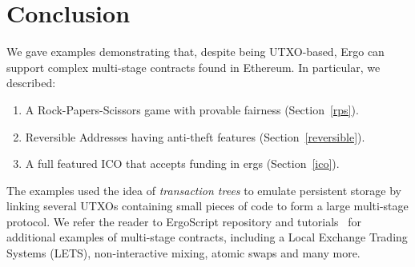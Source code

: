 \documentclass[runningheads]{llncs}
\newcommand{\langname}{ErgoScript\xspace}
\begin{document}
\section{Conclusion}

We gave examples demonstrating that, despite being UTXO-based, Ergo can support complex multi-stage contracts found in Ethereum. In particular, we described:

\begin{enumerate}
	\item A Rock-Papers-Scissors game with provable fairness (Section~\ref{rps}).
	\item Reversible Addresses having anti-theft features (Section~\ref{reversible}).
	\item A full featured ICO that accepts funding in ergs (Section~\ref{ico}). 

\end{enumerate}


The examples used the idea of {\em transaction trees} to emulate persistent storage by linking several UTXOs containing small pieces of code to form a large multi-stage protocol. 
We refer the reader to \langname repository and tutorials~\cite{tutorial,advtutorial} for additional examples of multi-stage contracts, including a Local Exchange Trading Systems (LETS), non-interactive mixing, atomic swaps and many more.



\end{document}
